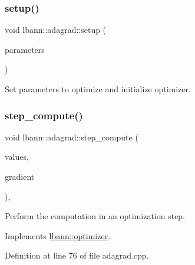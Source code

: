 \subsubsection{\texorpdfstring{setup()}{setup()}\hspace{0.1cm}{\footnotesize\ttfamily [2/2]}}
{\footnotesize\ttfamily void lbann\+::adagrad\+::setup (\begin{DoxyParamCaption}\item[{\hyperlink{base_8hpp_a9a697a504ae84010e7439ffec862b470}{Abs\+Dist\+Mat} $\ast$}]{parameters }\end{DoxyParamCaption})}



Set parameters to optimize and initialize optimizer. 

\mbox{\label{classlbann_1_1adagrad_a99dbaed2a331ce8d13a73e7beb7f5aba}} 
\subsubsection{\texorpdfstring{step\+\_\+compute()}{step\_compute()}}
{\footnotesize\ttfamily void lbann\+::adagrad\+::step\+\_\+compute (\begin{DoxyParamCaption}\item[{\hyperlink{base_8hpp_a9a697a504ae84010e7439ffec862b470}{Abs\+Dist\+Mat} \&}]{values,  }\item[{const \hyperlink{base_8hpp_a9a697a504ae84010e7439ffec862b470}{Abs\+Dist\+Mat} \&}]{gradient }\end{DoxyParamCaption})\hspace{0.3cm}{\ttfamily [override]}, {\ttfamily [virtual]}}

Perform the computation in an optimization step. 

Implements \hyperlink{classlbann_1_1optimizer_a0db72c298a0bc3405fb0af97d104a036}{lbann\+::optimizer}.



Definition at line 76 of file adagrad.\+cpp.


